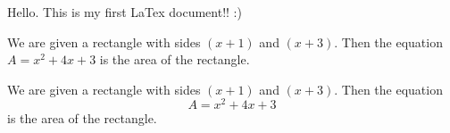 \documentclass[11pt]{article}
\begin{document}
Hello. This is my first LaTex document!! :)

We are given a rectangle with sides $(x+1)$ and $(x+3)$. Then the equation $A=x^2+4x+3$ is the area of the rectangle.

We are given a rectangle with sides $(x+1)$ and $(x+3)$. Then the equation $$A=x^2+4x+3$$ is the area of the rectangle.
\end{document}
